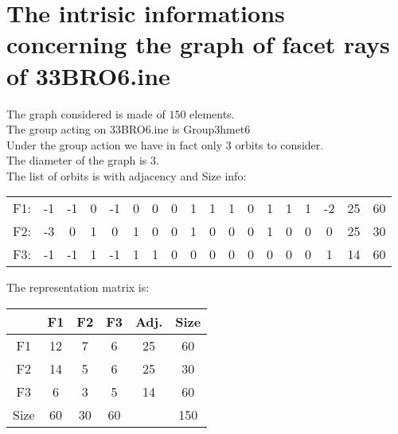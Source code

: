 \documentclass[12pt]{article}
\begin{document}
\section{The intrisic informations concerning the graph of facet rays of 33BRO6.ine}
The graph considered is made of $150$ elements.\\
The group acting on 33BRO6.ine is Group3hmet6\\
Under the group action we have in fact only $3$ orbits to consider.\\
The diameter of the graph is $3$.\\
The list of orbits is with adjacency and Size info:
\begin{center}
\scriptsize
\begin{tabular}{cccccccccccccccc|c|c}
F1:&-1&-1&0&-1&0&0&0&1&1&1&0&1&1&1&-2&25&60\\
F2:&-3&0&1&0&1&0&0&1&0&0&0&1&0&0&0&25&30\\
F3:&-1&-1&1&-1&1&1&0&0&0&0&0&0&0&0&1&14&60\\
\end{tabular}
\end{center}
The representation matrix is:
\begin{center}
\scriptsize
\begin{tabular}{|c|ccc|c|c|}
\hline
&F1&F2&F3&Adj.&Size\\
\hline
F1& 12& 7& 6&25&60\\
F2& 14& 5& 6&25&30\\
F3& 6& 3& 5&14&60\\
\hline
Size&60&30&60&&150\\
\hline
\end{tabular}
\end{center}
\end{document}

